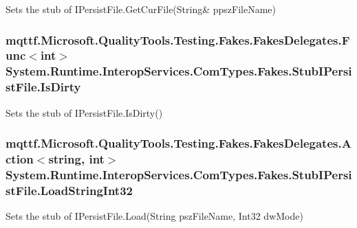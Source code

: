 Sets the stub of I\-Persist\-File.\-Get\-Cur\-File(String\& ppsz\-File\-Name)

\hypertarget{class_system_1_1_runtime_1_1_interop_services_1_1_com_types_1_1_fakes_1_1_stub_i_persist_file_a4d28a83abbb6c7111be2037ad264dc5d}{
\subsubsection[{Is\-Dirty}]{\setlength{\rightskip}{0pt plus 5cm}mqttf.\-Microsoft.\-Quality\-Tools.\-Testing.\-Fakes.\-Fakes\-Delegates.\-Func$<$int$>$ System.\-Runtime.\-Interop\-Services.\-Com\-Types.\-Fakes.\-Stub\-I\-Persist\-File.\-Is\-Dirty}}\label{class_system_1_1_runtime_1_1_interop_services_1_1_com_types_1_1_fakes_1_1_stub_i_persist_file_a4d28a83abbb6c7111be2037ad264dc5d}


Sets the stub of I\-Persist\-File.\-Is\-Dirty()

\hypertarget{class_system_1_1_runtime_1_1_interop_services_1_1_com_types_1_1_fakes_1_1_stub_i_persist_file_a04321a6dcc12776e0e9f31afbc2bb676}{
\subsubsection[{Load\-String\-Int32}]{\setlength{\rightskip}{0pt plus 5cm}mqttf.\-Microsoft.\-Quality\-Tools.\-Testing.\-Fakes.\-Fakes\-Delegates.\-Action$<$string, int$>$ System.\-Runtime.\-Interop\-Services.\-Com\-Types.\-Fakes.\-Stub\-I\-Persist\-File.\-Load\-String\-Int32}}\label{class_system_1_1_runtime_1_1_interop_services_1_1_com_types_1_1_fakes_1_1_stub_i_persist_file_a04321a6dcc12776e0e9f31afbc2bb676}


Sets the stub of I\-Persist\-File.\-Load(\-String psz\-File\-Name, Int32 dw\-Mode)


